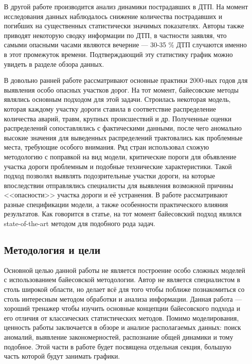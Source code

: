 \documentclass[a4paper, 14pt]{article}
\begin{document}
В другой работе \cite{konyuhov2015analysis} производится анализ динамики пострадавших в ДТП. На момент исследования данных наблюдалось снижение количества пострадавших и погибших на существенных статистически значимых показателях. Авторы также приводят некоторую сводку информации по ДТП, в частности заявляя, что самыми опасными часами являются вечерние --- 30-35 \% ДТП случаются именно в этот промежуток времени. Подтверждающий эту статистику график можно увидеть в разделе обзора данных. 

В довольно ранней работе \cite{elvik2007state} рассматривают основные практики 2000-ных годов для выявления особо опасных участков дорог. На тот момент, байесовские методы являлись основным подходом для этой задачи. Строилась некоторая модель, которая каждому участку дороги ставила в соответствие распределение количества аварий, травм, крупных происшествий и др. Полученные оценки распределений сопоставлялись с фактическими данными, после чего аномально высокие значения для выведенных распределений трактовались как проблемные места, требующие особого внимания. Ряд стран использовал схожую методологию с поправкой на вид модели, критические пороги для объявление участка дороги проблемным и подобные технические характеристики. Такой подход позволял выявлять подозрительные участки дороги, на которые впоследствии отправлялись специалисты для выявления возможной причины <<опасности>> участка дороги и её устранения. В работе рассматривают разные спецификации модели, а также особенности практического влияния результатов. Как говорится в статье, на тот момент байесовский подход являлся state-of-the-art методом для подобного рода задач.


\subsection{Методология и цели}
Основной целью данной работы не является построение особо сложных моделей с использованием байесовской методологии. Автор не является специалистом в столь широкой области, но делает всё для того чтобы поближе познакомиться со столь интересным методом обработки и анализа информации. Данная работа --- хороший тренажер чтобы изучить основные концепции байесовского подхода и его отличия от классических статистических методов. Помимо моделирования, ценность работы заключается в обзоре и анализе располагаемых данных: поиск аномалий, выявление закономерностей, распознание общей динамики и тому подобное. Этой части в работе будет посвящена отдельная секция, большую часть которой будут занимать графики.
\end{document}

